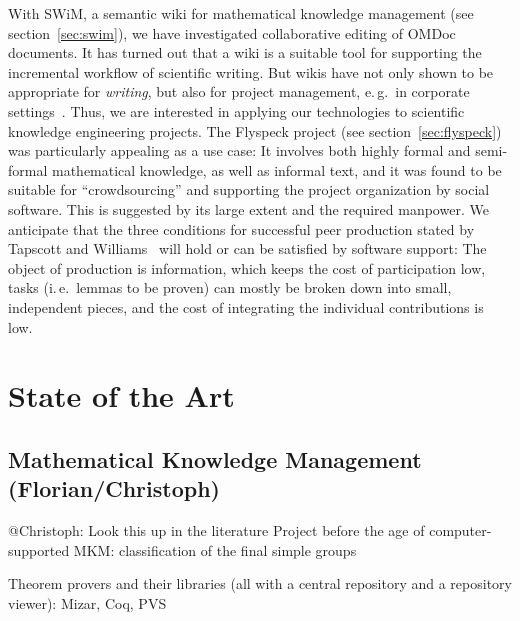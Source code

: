 \documentclass{llncs}
\begin{document}
With SWiM, a semantic wiki for mathematical knowledge management (see
section~\ref{sec:swim}), we have investigated collaborative editing of OMDoc documents.  It
has turned out that a wiki is a suitable tool for supporting the incremental workflow of
scientific writing.  But wikis have not only shown to be appropriate for \emph{writing},
but also for project management, e.\,g.\ in corporate settings~\cite{leuf01:wikiway}.
Thus, we are interested in applying our technologies to scientific knowledge engineering
projects.  The Flyspeck project (see section~\ref{sec:flyspeck}) was particularly
appealing as a use case: It involves both highly formal and semi-formal mathematical
knowledge, as well as informal text, and it was found  to be suitable for ``crowdsourcing''
and supporting the project organization by social software.  This is suggested by its
large extent and the required manpower.  We anticipate that the three conditions for
successful peer production stated by Tapscott and Williams~\cite{wikinomics} will hold or
can be satisfied by software support: The object of production is information, which keeps
the cost of participation low, tasks (i.\,e.\ lemmas to be proven) can mostly be broken
down into small, independent pieces, and the cost of integrating the individual
contributions is low.





\section{State of the Art}
\label{sec:sota}

\subsection{Mathematical Knowledge Management (Florian/Christoph)}
\label{sec:mkm}

\begin{todo}{@Christoph: Look this up in the literature}
Project before the age of computer-supported MKM: classification of the final simple groups
\end{todo}

Theorem provers and their libraries (all with a central repository and a repository
viewer): Mizar, Coq, PVS
\end{document}
